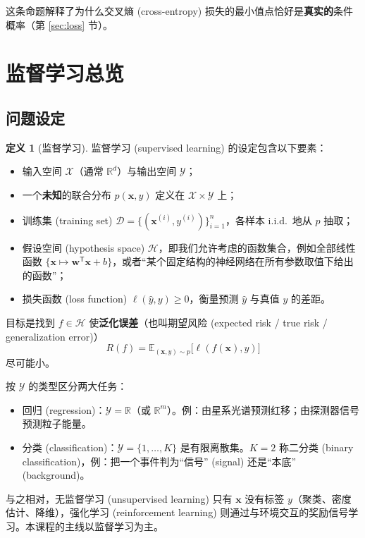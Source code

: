 \documentclass[UTF8,a4paper,11pt]{ctexart}
\theoremstyle{definition}
\newtheorem{definition}{定义}[section]
\theoremstyle{plain}
\theoremstyle{remark}
\newcommand{\R}{\mathbb{R}}
\newcommand{\E}{\mathbb{E}}
\newcommand{\D}{\mathcal{D}}
\newcommand{\Hyp}{\mathcal{H}}
\newcommand{\T}{^{\mathsf{T}}}
\newcommand{\eng}[1]{\textup{(#1)}}
\begin{document}
这条命题解释了为什么交叉熵 \eng{cross-entropy} 损失的最小值点恰好是\textbf{真实的}条件概率（第 \ref{sec:loss} 节）。

\section{监督学习总览}\label{sec:supervised}

\subsection{问题设定}

\begin{definition}[监督学习]\label{def:supervised}
监督学习 \eng{supervised learning} 的设定包含以下要素：
\begin{itemize}
  \item 输入空间 $\mathcal{X}$（通常 $\R^d$）与输出空间 $\mathcal{Y}$；
  \item 一个\textbf{未知}的联合分布 $p(\bm{x},y)$ 定义在 $\mathcal{X}\times\mathcal{Y}$ 上；
  \item 训练集 \eng{training set} $\D=\{(\bm{x}^{(i)},y^{(i)})\}_{i=1}^{n}$，各样本 i.i.d.\ 地从 $p$ 抽取；
  \item 假设空间 \eng{hypothesis space} $\Hyp$，即我们允许考虑的函数集合，例如全部线性函数 $\{\bm{x}\mapsto\bm{w}\T\bm{x}+b\}$，或者“某个固定结构的神经网络在所有参数取值下给出的函数”；
  \item 损失函数 \eng{loss function} $\ell(\hat{y},y)\ge0$，衡量预测 $\hat y$ 与真值 $y$ 的差距。
\end{itemize}
目标是找到 $f\in\Hyp$ 使\textbf{泛化误差}（也叫期望风险 \eng{expected risk / true risk / generalization error}）
\begin{equation}\label{eq:risk}
  R(f)=\E_{(\bm{x},y)\sim p}\big[\ell(f(\bm{x}),y)\big]
\end{equation}
尽可能小。
\end{definition}

按 $\mathcal{Y}$ 的类型区分两大任务：
\begin{itemize}
  \item 回归 \eng{regression}：$\mathcal{Y}=\R$（或 $\R^m$）。例：由星系光谱预测红移；由探测器信号预测粒子能量。
  \item 分类 \eng{classification}：$\mathcal{Y}=\{1,\dots,K\}$ 是有限离散集。$K=2$ 称二分类 \eng{binary classification}，例：把一个事件判为“信号” \eng{signal} 还是“本底” \eng{background}。
\end{itemize}
与之相对，无监督学习 \eng{unsupervised learning} 只有 $\bm{x}$ 没有标签 $y$（聚类、密度估计、降维），强化学习 \eng{reinforcement learning} 则通过与环境交互的奖励信号学习。本课程的主线以监督学习为主。
\end{document}

